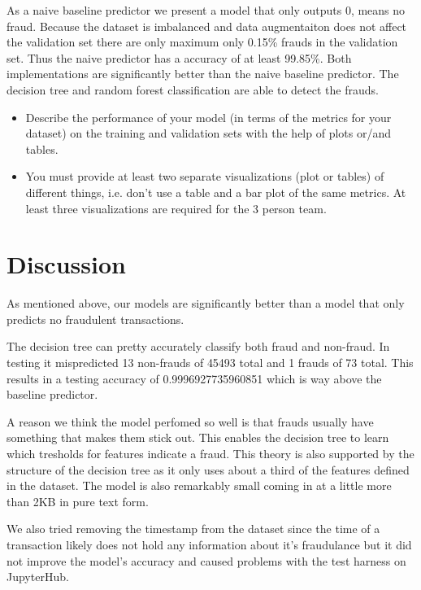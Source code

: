 \documentclass[a4paper, 10pt, conference]{ieeeconf}      %
\begin{document}
As a naive baseline predictor we present a model that only outputs 0, means no fraud. 
Because the dataset is imbalanced and data augmentaiton does not affect the validation set there are only maximum only 0.15\% frauds in the validation set. 
Thus the naive predictor has a accuracy of at least 99.85\%. 
Both implementations are significantly better than the naive baseline predictor. The decision tree and random forest classification are able to detect the frauds. 



{\color{blue}

\begin{itemize}
	\item Describe the performance of your model (in terms of the metrics for your dataset) on the training and validation sets with the help of plots or/and tables.
	\item You must provide at least two separate visualizations
          (plot or tables) of different things, i.e. don’t use a table
          and a bar plot of the same metrics. At least three
           visualizations are required for the 3 person team.
\end{itemize}
}

\section{Discussion}
\label{sec:discuss}
As mentioned above, our models are significantly better than a model that only predicts no fraudulent transactions.

The decision tree can pretty accurately classify both fraud and non-fraud. 
In testing it mispredicted 13 non-frauds of 45493 total and 1 frauds of 73 total.
This results in a testing accuracy of 0.9996927735960851 which is way above the baseline predictor.

A reason we think the model perfomed so well is that frauds usually have something that makes them stick out. 
This enables the decision tree to learn which tresholds for features indicate a fraud. 
This theory is also supported by the structure of the decision tree as it only uses about a third of the features defined in the dataset.
The model is also remarkably small coming in at a little more than 2KB in pure text form.

We also tried removing the timestamp from the dataset since the time of a transaction likely does not hold any information about it's fraudulance but it did not improve the model's accuracy and caused problems with the test harness on JupyterHub.
\end{document}
